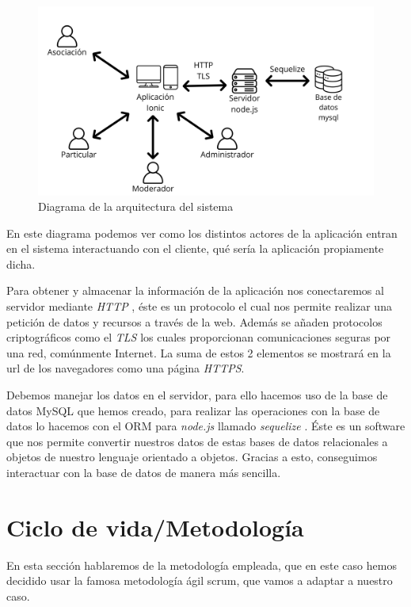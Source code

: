 \begin{figure}[H]
	\centering
	\includegraphics[width=1\linewidth]{"Sprint 0/diagramaArquitectura"}
	\caption{Diagrama de la arquitectura del sistema}
	\label{fig:diagrama_arquitectura}
\end{figure}

En este diagrama podemos ver como los distintos actores de la aplicación entran en el sistema interactuando con el cliente, qué sería la aplicación propiamente dicha. 

Para obtener y almacenar la información de la aplicación nos conectaremos al servidor mediante \textit{HTTP} \cite{http}, éste es un protocolo el cual nos permite realizar una petición de datos y recursos a través de la web. Además se añaden protocolos criptográficos como el \textit{TLS} \cite{tls} los cuales proporcionan comunicaciones seguras por una red, comúnmente Internet. La suma de estos 2 elementos se mostrará en la url de los navegadores como una página \textit{HTTPS}.

Debemos manejar los datos en el servidor, para ello hacemos uso de la base de datos MySQL que hemos creado, para realizar las operaciones con la base de datos lo hacemos con el ORM para \textit{node.js} llamado \textit{sequelize} \cite{orm}. Éste es un software que nos permite convertir nuestros datos de estas bases de datos relacionales a objetos de nuestro lenguaje orientado a objetos. Gracias a esto, conseguimos interactuar con la base de datos de manera más sencilla.

\section{Ciclo de vida/Metodología}  \label{metod}
En esta sección hablaremos de la metodología empleada, que en este caso hemos decidido usar la famosa metodología ágil scrum, que vamos a adaptar a nuestro caso.

